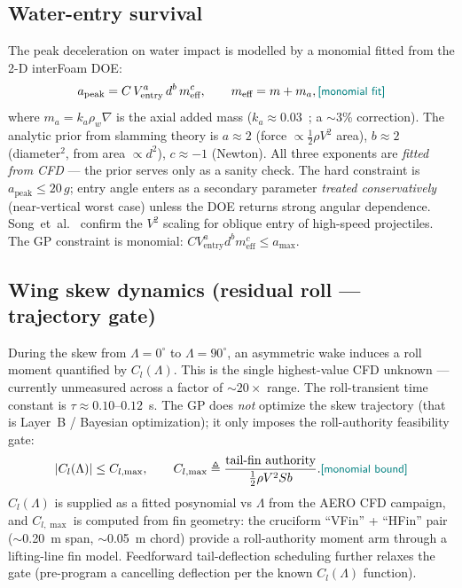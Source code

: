 \documentclass[conf]{new-aiaa}
\newcommand{\gpc}[1]{\textcolor{teal}{\small\textsf{[#1]}}} %
\begin{document}
\subsection{Water-entry survival}\label{sec:entry}
The peak deceleration on water impact is modelled by a monomial fitted from the 2-D interFoam DOE:
\begin{equation}
a_{\text{peak}} = C\, V_{\text{entry}}^a\, d^b\, m_{\text{eff}}^c,
\qquad m_{\text{eff}} = m + m_a, \gpc{monomial fit}
\end{equation}
where $m_a=k_a\rho_w\nabla$ is the axial added mass
($k_a\approx0.03$~\cite{newman2018marine}; a $\sim$3\% correction). The analytic prior from
slamming theory is $a\approx2$ (force $\propto\frac12\rho V^2$ area), $b\approx2$ (diameter$^2$, from area $\propto d^2$),
$c\approx-1$ (Newton). All three exponents are \emph{fitted from CFD} — the prior serves only as a
sanity check. The hard constraint is $a_{\text{peak}}\le 20\,g$; entry angle enters as a secondary
parameter \emph{treated conservatively} (near-vertical worst case) unless the DOE returns strong
angular dependence. Song~et~al.~\cite{song2020waterentry} confirm the $V^2$ scaling for oblique
entry of high-speed projectiles. The GP constraint is monomial: $C V_{\text{entry}}^a d^b
m_{\text{eff}}^c \le a_{\max}$.

\subsection{Wing skew dynamics (residual roll — trajectory gate)}\label{sec:roll}
During the skew from $\Lambda=0^\circ$ to $\Lambda=90^\circ$, an asymmetric wake induces a roll
moment quantified by $C_l(\Lambda)$. This is the single highest-value CFD unknown — currently
unmeasured across a factor of $\sim20\times$ range. The roll-transient time constant is
$\tau\approx0.10$--$0.12$~s. The GP does \emph{not} optimize the skew trajectory
(that is Layer~B / Bayesian optimization); it only imposes the roll-authority feasibility gate:
\begin{equation}
|C_l(\Lambda)| \le C_{l,\max},
\qquad C_{l,\max} \triangleq \frac{\text{tail-fin authority}}{\tfrac12\rho V^2 S b}.
\gpc{monomial bound}
\end{equation}
$C_l(\Lambda)$ is supplied as a fitted posynomial vs $\Lambda$ from the AERO CFD campaign, and
$C_{l,\max}$ is computed from fin geometry: the cruciform ``VFin'' + ``HFin'' pair
($\sim$0.20~m span, $\sim$0.05~m chord) provide a roll-authority moment arm through a
lifting-line fin model. Feedforward tail-deflection scheduling further relaxes the gate (pre-program a
cancelling deflection per the known $C_l(\Lambda)$ function).
\end{document}
